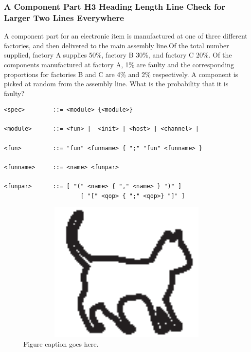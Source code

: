 \subsubsection{A Component Part H3 Heading Length Line Check for Larger Two Lines Everywhere}
A component part for an electronic item is
manufactured at one of three different factories, and then delivered to
the main assembly line.Of the total number supplied, factory A supplies
50\%, factory B 30\%, and factory C 20\%. Of the components
manufactured at factory A, 1\% are faulty and the corresponding
proportions for factories B and C are 4\% and 2\% respectively. A
component is picked at random from the assembly line. What is the
probability that it is faulty? 
\begin{verbatim}
<spec>        ::= <module> {<module>}   

<module>      ::= <fun> |  <init> | <host> | <channel> |

<fun>         ::= "fun" <funname> { ";" "fun" <funname> }

<funname>     ::= <name> <funpar> 

<funpar>      ::= [ "(" <name> { "," <name> } ")" ] 
                      [ "[" <qop> { ";" <qop>} "]" ]
\end{verbatim}

\begin{figure}
\includegraphics[width=350pt, height=200pt]{figs/cat.eps}
\caption[List of figure caption goes here]{Figure caption goes here.}
\end{figure}



